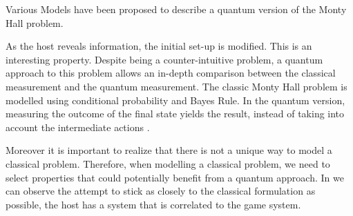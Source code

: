 Various Models have been proposed to describe a quantum version of the Monty Hall problem\cite{Gill}\cite{Flitney2008}.

As the host reveals information, the initial set-up is modified. This is an interesting property. Despite being a counter-intuitive problem, a quantum approach to this problem allows an in-depth comparison between the classical measurement and the quantum measurement. The classic Monty Hall problem is modelled using conditional probability and Bayes Rule. In the quantum version, measuring the outcome of the final state yields the result, instead of taking into account the intermediate actions \cite{Fra2011}.

Moreover it is important to realize that there is not a unique way to model a classical problem\cite{Gill2002}. Therefore, when modelling a classical problem, we need to select properties that could potentially benefit from a quantum approach. In \cite{Gill2002} we can observe the attempt to stick as closely to the classical formulation as possible, the host has a system that is correlated to the game system.








